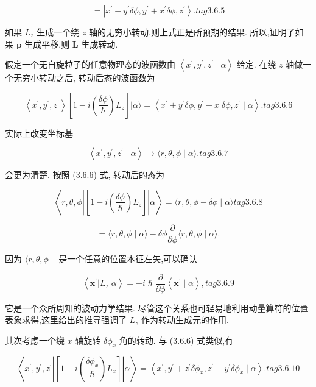 $$
= \left| {{x}^{\prime } - {y}^{\prime }{\delta \phi },{y}^{\prime } + {x}^{\prime }{\delta \phi },{z}^{\prime }}\right\rangle . tag{3.6.5}
$$

如果 ${L}_{z}$ 生成一个绕 $z$ 轴的无穷小转动,则上式正是所预期的结果. 所以,证明了如果 $\mathbf{p}$ 生成平移,则 $\mathbf{L}$ 生成转动.

假定一个无自旋粒子的任意物理态的波函数由 $\left\langle {{x}^{\prime },{y}^{\prime },{z}^{\prime } \mid \alpha }\right\rangle$ 给定. 在绕 $z$ 轴做一个无穷小转动之后, 转动后态的波函数为

$$
\left\langle {{x}^{\prime },{y}^{\prime },{z}^{\prime }}\right\rangle \left\lbrack {1 - i\left( \frac{\delta \phi }{\hslash }\right) {L}_{z}}\right\rbrack |\alpha \rangle = \left\langle {{x}^{\prime } + {y}^{\prime }{\delta \phi },{y}^{\prime } - {x}^{\prime }{\delta \phi },{z}^{\prime } \mid \alpha }\right\rangle . tag{3.6.6}
$$

实际上改变坐标基

$$
\left\langle {{x}^{\prime },{y}^{\prime },{z}^{\prime } \mid \alpha }\right\rangle \rightarrow \langle r,\theta ,\phi \mid \alpha \rangle . tag{3.6.7}
$$

会更为清楚. 按照 (3.6.6) 式, 转动后的态为

$$
\left\langle {r,\theta ,\phi \left| \left\lbrack {1 - i\left( \frac{\delta \phi }{\hslash }\right) {L}_{z}}\right\rbrack \right| \alpha }\right\rangle = \langle r,\theta ,\phi - {\delta \phi } \mid \alpha \rangle tag{3.6.8}
$$

$$
= \langle r,\theta ,\phi \mid \alpha \rangle - {\delta \phi }\frac{\partial }{\partial \phi }\langle r,\theta ,\phi \mid \alpha \rangle .
$$

因为 $\langle r,\theta ,\phi \mid$ 是一个任意的位置本征左矢,可以确认

$$
\left\langle {{\mathbf{x}}^{\prime }\left| {L}_{z}\right| \alpha }\right\rangle = - i\hslash \frac{\partial }{\partial \phi }\left\langle {{\mathbf{x}}^{\prime } \mid \alpha }\right\rangle , tag{3.6.9}
$$

它是一个众所周知的波动力学结果. 尽管这个关系也可轻易地利用动量算符的位置表象求得,这里给出的推导强调了 ${L}_{z}$ 作为转动生成元的作用.

其次考虑一个绕 $x$ 轴旋转 $\delta {\phi }_{x}$ 角的转动. 与 (3.6.6) 式类似,有

$$
\left\langle {{x}^{\prime },{y}^{\prime },{z}^{\prime }\left| \left\lbrack {1 - i\left( \frac{\delta {\phi }_{x}}{\hslash }\right) {L}_{x}}\right\rbrack \right| \alpha }\right\rangle = \left\langle {{x}^{\prime },{y}^{\prime } + {z}^{\prime }\delta {\phi }_{x},{z}^{\prime } - {y}^{\prime }\delta {\phi }_{x} \mid \alpha }\right\rangle . tag{3. 6.10}
$$

